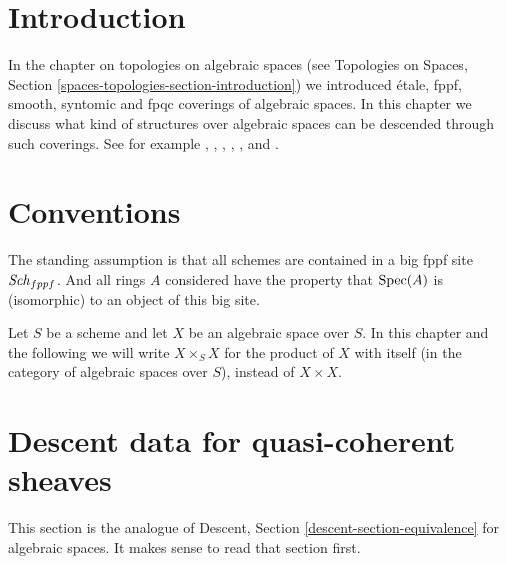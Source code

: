 \section{Introduction}
\label{spaces-descent-section-introduction}
In the chapter on topologies on algebraic spaces (see
Topologies on Spaces, Section \ref{spaces-topologies-section-introduction})
we introduced \'etale, fppf, smooth, syntomic and fpqc coverings of
algebraic spaces.
In this chapter we discuss what kind of structures over algebraic spaces
can be descended through such coverings.
See for example \cite{Gr-I}, \cite{Gr-II}, \cite{Gr-III},
\cite{Gr-IV}, \cite{Gr-V}, and \cite{Gr-VI}.

\section{Conventions}
\label{spaces-descent-section-conventions}
The standing assumption is that all schemes are contained in
a big fppf site $\mathit{Sch}_{fppf}$. And all rings $A$ considered
have the property that $\operatorname{Spec}(A)$ is (isomorphic) to an
object of this big site.

\medskip\noindent
Let $S$ be a scheme and let $X$ be an algebraic space over $S$.
In this chapter and the following we will write $X \times_S X$
for the product of $X$ with itself (in the category of algebraic
spaces over $S$), instead of $X \times X$.

\section{Descent data for quasi-coherent sheaves}
\label{spaces-descent-section-equivalence}
This section is the analogue of
Descent, Section \ref{descent-section-equivalence}
for algebraic spaces.
It makes sense to read that section first.

